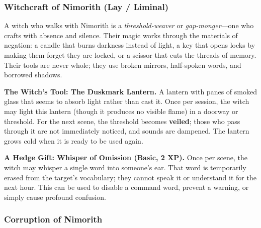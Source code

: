 \subsubsection*{Witchcraft of Nimorith (Lay / Liminal)}

A witch who walks with Nimorith is a \textit{threshold-weaver} or \textit{gap-monger}---one who crafts with absence and silence. Their magic works through the materials of negation: a candle that burns darkness instead of light, a key that opens locks by making them forget they are locked, or a scissor that cuts the threads of memory. Their tools are never whole; they use broken mirrors, half-spoken words, and borrowed shadows.

\textbf{The Witch's Tool: The Duskmark Lantern.} A lantern with panes of smoked glass that seems to absorb light rather than cast it. Once per session, the witch may light this lantern (though it produces no visible flame) in a doorway or threshold. For the next scene, the threshold becomes \textbf{veiled}; those who pass through it are not immediately noticed, and sounds are dampened. The lantern grows cold when it is ready to be used again.

\textbf{A Hedge Gift: Whisper of Omission (Basic, 2 XP).} Once per scene, the witch may whisper a single word into someone's ear. That word is temporarily erased from the target's vocabulary; they cannot speak it or understand it for the next hour. This can be used to disable a command word, prevent a warning, or simply cause profound confusion.

\subsubsection*{Corruption of Nimorith}

